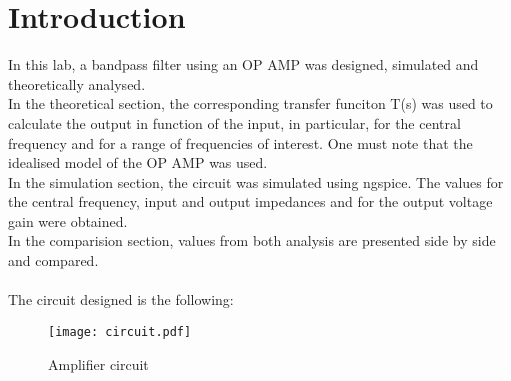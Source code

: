 \section{Introduction}
\label{sec:intro}
In this lab, a bandpass filter using an OP AMP was designed, simulated and theoretically analysed.\\
 In the theoretical section, the corresponding transfer funciton T(s) was used to calculate the output in function of the input, in particular, for the central frequency and for a range of frequencies of interest. One must note that the idealised model of the OP AMP was used. \\
 In the simulation section, the circuit was simulated using ngspice. The values for the central frequency, input and output impedances and for the output voltage gain were obtained.\\
In the comparision section, values from both analysis are presented side by side and compared.\\ \\
The circuit designed is the following:
\begin{figure} [!htb] 
  \texttt{[image: circuit.pdf]}
  \caption{Amplifier circuit}
  \label{fig:theoplots}
  \endminipage\hfill
\end{figure}


